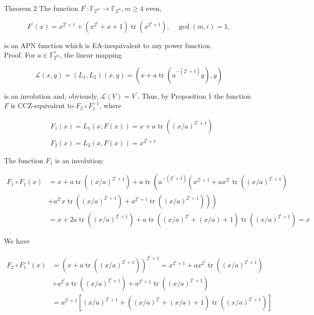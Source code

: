 \documentclass[10pt]{article}
\begin{document}
Theorem 2 The function $F^{\prime}: \mathbb{F}_{2^{m}} \rightarrow \mathbb{F}_{2^{m}}, m \geq 4$ even,

$$
F^{\prime}(x)=x^{2^{i}+1}+\left(x^{2^{i}}+x+1\right) \operatorname{tr}\left(x^{2^{i}+1}\right), \quad \operatorname{gcd}(m, i)=1,
$$

is an APN function which is EA-inequivalent to any power function.\\
Proof. For $a \in \mathbb{F}_{2^{m}}^{*}$, the linear mapping

$$
\mathcal{L}(x, y)=\left(L_{1}, L_{2}\right)(x, y)=\left(x+a \operatorname{tr}\left(a^{-\left(2^{i}+1\right)} y\right), y\right)
$$

is an involution and, obviously, $\mathcal{L}(V)=V^{\prime}$. Thus, by Proposition 1 the function $F$ is CCZ-equivalent to $F_{2} \circ F_{1}^{-1}$, where

$$
\begin{aligned}
& F_{1}(x)=L_{1}(x, F(x))=x+a \operatorname{tr}\left((x / a)^{2^{i}+1}\right) \\
& F_{2}(x)=L_{2}(x, F(x))=x^{2^{i}+1}
\end{aligned}
$$

The function $F_{1}$ is an involution:

$$
\begin{aligned}
F_{1} \circ F_{1}(x) & =x+a \operatorname{tr}\left((x / a)^{2^{i}+1}\right)+a \operatorname{tr}\left(a ^ { - ( 2 ^ { i } + 1 ) } \left(x^{2^{i}+1}+a x^{2^{i}} \operatorname{tr}\left((x / a)^{2^{i}+1}\right)\right.\right. \\
& \left.\left.+a^{2^{i}} x \operatorname{tr}\left((x / a)^{2^{i}+1}\right)+a^{2^{i}+1} \operatorname{tr}\left((x / a)^{2^{i}+1}\right)\right)\right) \\
& =x+2 a \operatorname{tr}\left((x / a)^{2^{i}+1}\right)+a \operatorname{tr}\left((x / a)^{2^{i}}+(x / a)+1\right) \operatorname{tr}\left((x / a)^{2^{i}+1}\right)=x
\end{aligned}
$$

We have

$$
\begin{aligned}
F_{2} \circ F_{1}^{-1}(x) & =\left(x+a \operatorname{tr}\left((x / a)^{2^{i}+1}\right)\right)^{2^{i}+1}=x^{2^{i}+1}+a x^{2^{i}} \operatorname{tr}\left((x / a)^{2^{i}+1}\right) \\
& +a^{2^{i}} x \operatorname{tr}\left((x / a)^{2^{i}+1}\right)+a^{2^{i}+1} \operatorname{tr}\left((x / a)^{2^{i}+1}\right) \\
& =a^{2^{i}+1}\left[(x / a)^{2^{i}+1}+\left((x / a)^{2^{i}}+(x / a)+1\right) \operatorname{tr}\left((x / a)^{2^{i}+1}\right)\right]
\end{aligned}
$$
\end{document}
